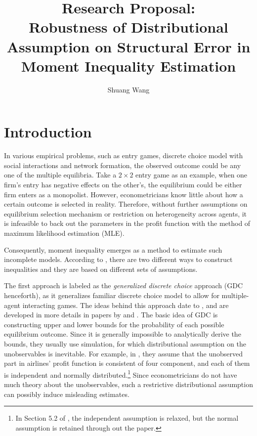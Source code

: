 \documentclass[a4paper]{article}
\title{Research Proposal:\\
Robustness of Distributional Assumption on Structural Error in Moment Inequality Estimation}
\author{Shuang Wang}
\begin{document}
\maketitle


\section{Introduction}


In various empirical problems, such as entry games, discrete choice model with social interactions and network formation, the observed outcome could be any one of the multiple equilibria. Take a $2\times2$ entry game as an example, when one firm's entry has negative effects on the other's, the equilibrium could be either firm enters as a monopolist. However, econometricians know little about how a certain outcome is selected in reality. Therefore, without further assumptions on equilibrium selection mechanism or restriction on heterogeneity across agents, it is infeasible to back out the parameters in the profit function with the method of maximum likelihood estimation (MLE).

Consequently, moment inequality emerges as a method to estimate such incomplete models. According to \cite{pakes2010alternative}, there are two different ways to construct inequalities and they are based on different sets of assumptions. 

The first approach is labeled as the \textit{generalized discrete choice} approach (GDC henceforth), as it generalizes familiar discrete choice model to allow for multiple-agent interacting games. The ideas behind this approach date to \cite{tamer2003incomplete}, and are developed in more details in papers by \cite{ciliberto2009market} and \cite{andrews2004confidence}. The basic idea of GDC is constructing upper and lower bounds for the probability of each possible equilibrium outcome. Since it is generally impossible to analytically derive the bounds, they usually use simulation, for which distributional assumption on the unobservables is inevitable. For example, in \cite{ciliberto2009market}, they assume that the unobserved part in airlines' profit function is consistent of four component, and each of them is independent and normally distributed.\footnote{In Section 5.2 of \cite{ciliberto2009market}, the independent assumption is relaxed, but the normal assumption is retained through out the paper.} Since econometricians do not have much theory about the unobservables, such a restrictive distributional assumption can possibly induce misleading estimates. 
\end{document}

